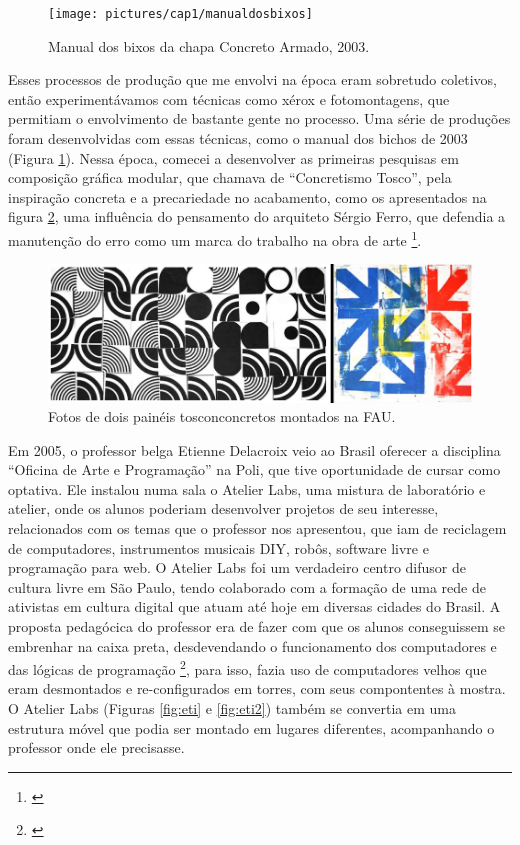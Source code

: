 \begin{figure}

\texttt{[image: pictures/cap1/manualdosbixos]}
\caption{Manual dos bixos da chapa Concreto Armado, 2003.}
\label{fig:bichos}
\end{figure}

Esses processos de produção que me envolvi na época eram sobretudo coletivos, então experimentávamos com técnicas como xérox e fotomontagens, que permitiam o envolvimento de bastante gente no processo. Uma série de produções foram desenvolvidas com essas técnicas, como o manual dos bichos de 2003 (Figura \ref{fig:bichos}). Nessa época, comecei a desenvolver as primeiras pesquisas em composição gráfica modular, que chamava de ``Concretismo Tosco'', pela inspiração concreta e a precariedade no acabamento, como os apresentados na figura \ref{fig:tosconcreto}, uma influência do pensamento do arquiteto Sérgio Ferro, que defendia a manutenção do erro como um marca do trabalho na obra de arte \footnote{\cite{FerroSergio2002}}. 

\begin{figure}

\includegraphics[width=1\textwidth]{pictures/cap1/tosconcreto}
\caption{Fotos de dois painéis tosconconcretos montados na FAU.}
\label{fig:tosconcreto}
\end{figure}

Em 2005, o professor belga Etienne Delacroix veio ao Brasil oferecer a disciplina ``Oficina de Arte e Programação'' na Poli, que tive oportunidade de cursar como optativa. Ele instalou numa sala o Atelier Labs, uma mistura de laboratório e atelier, onde os alunos poderiam desenvolver projetos de seu interesse, relacionados com os temas que o professor nos apresentou, que iam de reciclagem de computadores, instrumentos musicais DIY, robôs, software livre e programação para web. O Atelier Labs foi um verdadeiro centro difusor de cultura livre em São Paulo, tendo colaborado com a formação de uma rede de ativistas em cultura digital que atuam até hoje em diversas cidades do Brasil. A proposta pedagócica do professor era de fazer com que os alunos conseguissem se embrenhar na caixa preta, desdevendando o funcionamento dos computadores e das lógicas de programação \footnote{\cite{Delacroix2009}}, para isso, fazia uso de computadores velhos que eram desmontados e re-configurados em torres, com seus compontentes à mostra. O Atelier Labs (Figuras \ref{fig:eti} e \ref{fig:eti2}) também se convertia em uma estrutura móvel que podia ser montado em lugares diferentes, acompanhando o professor onde ele precisasse.

